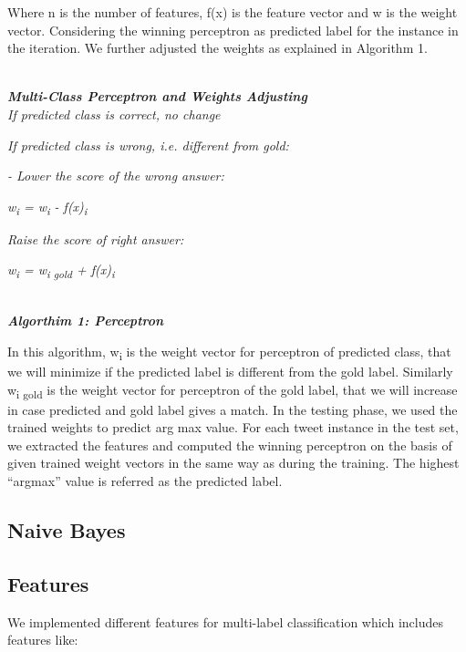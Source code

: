 \documentclass[11pt]{article}
\begin{document}
  Where n is the number of features, f(x) is the feature vector and w is the weight vector. Considering the winning perceptron as predicted label for the instance in the iteration. We further adjusted the weights as explained in Algorithm 1.
  
  \noindent\hrulefill\\
   \textbf{\emph {Multi-Class Perceptron and Weights Adjusting}} \\
  
  \emph{ If predicted class is correct, no change}
  
  \emph{If predicted class is wrong, i.e. different from gold:}
  
  \emph{- Lower the score of the wrong answer:}
  
  \emph{w\textsubscript{i} = w\textsubscript{i} - f(x)\textsubscript{i}}
  
  \emph{Raise the score of right answer:}
  
  \emph{w\textsubscript{i} = w\textsubscript{i gold} + f(x)\textsubscript{i} }
  
  \noindent\hrulefill\\
  \textbf{\emph{ Algorthim 1: Perceptron }}
  
  In this algorithm, w\textsubscript{i} is the weight vector for perceptron of predicted class, that we will minimize if the predicted label is different from the gold label. Similarly w\textsubscript{i gold} is the weight vector for perceptron of the gold label, that we will increase in case predicted and gold label gives a match.
  In the testing phase, we used the trained weights to predict arg max value. For each tweet instance in the test set, we extracted the features and computed the
  winning perceptron on the basis of given trained weight vectors in the same way as during the training. The highest “argmax” value is referred as the
  predicted label.\\
  
  \subsection{Naive Bayes}
  
  
  
  \subsection{Features}
  
  We implemented different features for multi-label classification which includes features like:
  
\end{document}
